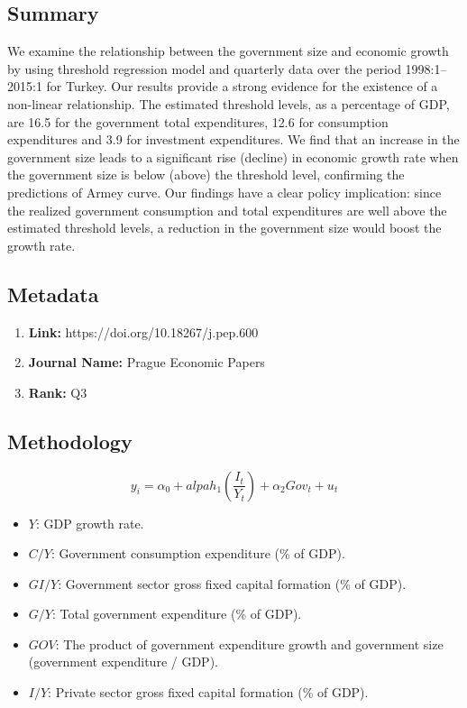 \documentclass[10pt, oneside]{article}
\begin{document}
\subsection{Summary}
We examine the relationship between the government size and economic growth by using
threshold regression model and quarterly data over the period 1998:1–2015:1 for Turkey. Our
results provide a strong evidence for the existence of a non-linear relationship. The estimated
threshold levels, as a percentage of GDP, are 16.5 for the government total expenditures,
12.6 for consumption expenditures and 3.9 for investment expenditures. We find that an
increase in the government size leads to a significant rise (decline) in economic growth rate
when the government size is below (above) the threshold level, confirming the predictions
of Armey curve. Our findings have a clear policy implication: since the realized government
consumption and total expenditures are well above the estimated threshold levels, a reduction
in the government size would boost the growth rate. \cite{iyidogan2017government}

\subsection{Metadata}
\begin{enumerate}
	\item \textbf{Link:} https://doi.org/10.18267/j.pep.600
	\item \textbf{Journal Name:} Prague Economic Papers
	\item \textbf{Rank:} Q3
\end{enumerate}

\subsection{Methodology}

$$
	y_i = \alpha_0 + alpah_1(\frac{I_t}{Y_t}) + \alpha_2 Gov_t + u_t
$$
\begin{itemize}
	\item $Y$: GDP growth rate.
	\item $C/Y$: Government consumption expenditure (\% of GDP).
	\item $GI/Y$: Government sector gross fixed capital formation (\% of GDP).
	\item $G/Y$: Total government expenditure (\% of GDP).
	\item $GOV$: The product of government expenditure growth and government size (government expenditure / GDP).
	\item $I/Y$: Private sector gross fixed capital formation (\% of GDP).
\end{itemize}
\end{document}
